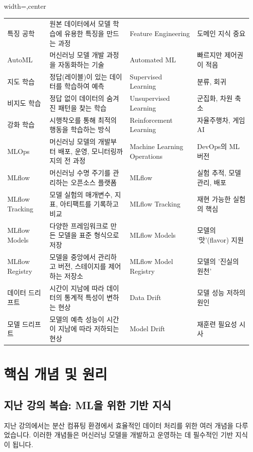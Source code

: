 \documentclass[11pt,a4paper]{article}
\begin{document}
\begin{tcolorbox}[summarybox={핵심 용어 및 설명}]
\begin{adjustbox}{width=\textwidth,center}
\begin{tabular}{llll}
특징 공학 & 원본 데이터에서 모델 학습에 유용한 특징을 만드는 과정 & Feature Engineering & 도메인 지식 중요 \\
AutoML & 머신러닝 모델 개발 과정을 자동화하는 기술 & Automated ML & 빠르지만 제어권이 적음 \\
지도 학습 & 정답(레이블)이 있는 데이터를 학습하여 예측 & Supervised Learning & 분류, 회귀 \\
비지도 학습 & 정답 없이 데이터의 숨겨진 패턴을 찾는 학습 & Unsupervised Learning & 군집화, 차원 축소 \\
강화 학습 & 시행착오를 통해 최적의 행동을 학습하는 방식 & Reinforcement Learning & 자율주행차, 게임 AI \\
MLOps & 머신러닝 모델의 개발부터 배포, 운영, 모니터링까지의 전 과정 & Machine Learning Operations & DevOps의 ML 버전 \\
MLflow & 머신러닝 수명 주기를 관리하는 오픈소스 플랫폼 & MLflow & 실험 추적, 모델 관리, 배포 \\
MLflow Tracking & 모델 실험의 매개변수, 지표, 아티팩트를 기록하고 비교 & MLflow Tracking & 재현 가능한 실험의 핵심 \\
MLflow Models & 다양한 프레임워크로 만든 모델을 표준 형식으로 저장 & MLflow Models & 모델의 '맛'(flavor) 지원 \\
MLflow Registry & 모델을 중앙에서 관리하고 버전, 스테이지를 제어하는 저장소 & MLflow Model Registry & 모델의 '진실의 원천' \\
데이터 드리프트 & 시간이 지남에 따라 데이터의 통계적 특성이 변하는 현상 & Data Drift & 모델 성능 저하의 원인 \\
모델 드리프트 & 모델의 예측 성능이 시간이 지남에 따라 저하되는 현상 & Model Drift & 재훈련 필요성 시사 \\
\bottomrule
\end{tabular}
\end{adjustbox}
\end{tcolorbox}

\newpage
\section*{핵심 개념 및 원리}

\subsection*{지난 강의 복습: ML을 위한 기반 지식}
지난 강의에서는 분산 컴퓨팅 환경에서 효율적인 데이터 처리를 위한 여러 개념을 다루었습니다. 이러한 개념들은 머신러닝 모델을 개발하고 운영하는 데 필수적인 기반 지식이 됩니다.
\end{document}
